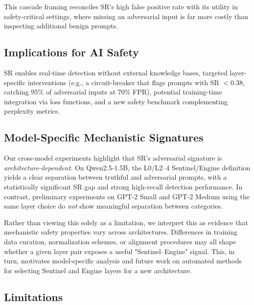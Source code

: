 This cascade framing reconciles SR's high false positive rate with its utility in safety-critical settings, where missing an adversarial input is far more costly than inspecting additional benign prompts.

\subsection{Implications for AI Safety}

SR enables real-time detection without external knowledge bases, targeted layer-specific interventions (e.g., a circuit-breaker that flags prompts with SR $< 0.38$, catching 95\% of adversarial inputs at 70\% FPR), potential training-time integration via loss functions, and a new safety benchmark complementing perplexity metrics.

\subsection{Model-Specific Mechanistic Signatures}

Our cross-model experiments highlight that SR's adversarial signature is \emph{architecture-dependent}. On Qwen2.5-1.5B, the L0/L2--4 Sentinel/Engine definition yields a clear separation between truthful and adversarial prompts, with a statistically significant SR gap and strong high-recall detection performance. In contrast, preliminary experiments on GPT-2 Small and GPT-2 Medium using the same layer choice do \emph{not} show meaningful separation between categories.

Rather than viewing this solely as a limitation, we interpret this as evidence that mechanistic safety properties vary across architectures. Differences in training data curation, normalization schemes, or alignment procedures may all shape whether a given layer pair exposes a useful "Sentinel--Engine" signal. This, in turn, motivates model-specific analysis and future work on automated methods for selecting Sentinel and Engine layers for a new architecture.

\subsection{Limitations}

